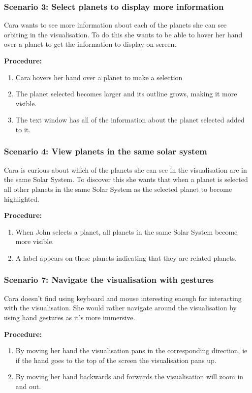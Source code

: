  \subsubsection{Scenario 3: Select planets to display more information}
 Cara wants to see more information about each of the planets she can see
orbiting in the visualisation. To do this she wants to be able to hover her hand
over a planet to get the information to display on screen.
 
  {\bf  Procedure:}
   \begin{enumerate}
 \item Cara hovers her hand over a planet to make a selection
 \item The planet selected becomes larger and its outline grows, making it more
visible.
\item The text window has all of the information about the planet selected added
to it.
 \end{enumerate}
 
 \subsubsection{Scenario 4: View planets in the same solar system}
Cara is curious about which of the planets she can see in the
visualisation are in the same Solar System. To discover this she wants that when
a planet is selected all other planets in the same Solar System as the selected
planet to become highlighted.
 
  {\bf  Procedure:}
   \begin{enumerate}
 \item When John selects a planet, all planets in the same Solar System become
more visible.
 \item A label appears on these planets indicating that they are related
planets.
 \end{enumerate}

 \subsubsection{Scenario 7: Navigate the visualisation with gestures}
Cara doesn't find using keyboard and mouse interesting enough for interacting
with the visualisation. She would rather navigate around the visualisation by
using hand
gestures as it's more immersive.

  {\bf  Procedure:}
   \begin{enumerate}
 \item By moving her hand the visualisation pans
in the corresponding direction, ie if the hand goes to the top of the screen
the visualisation pans up.
 \item By moving her hand backwards and forwards the visualisation will zoom in
and out.
  \end{enumerate}
  
